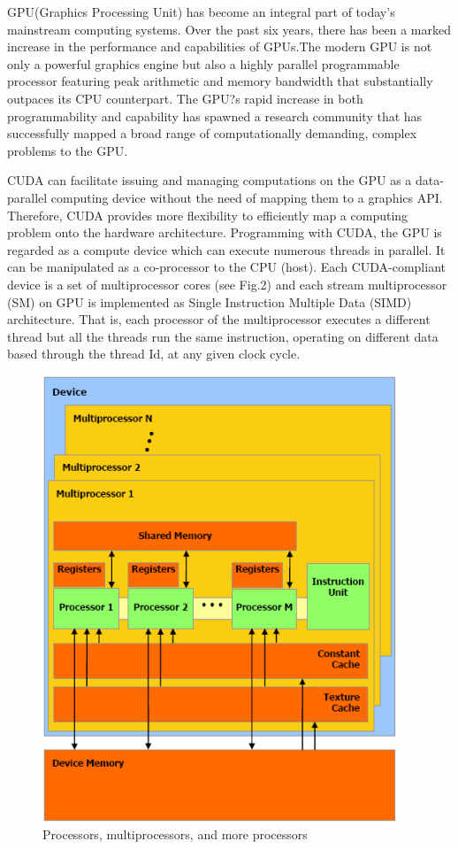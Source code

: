 \documentclass[letterpaper,twocolumn,10pt]{article}
\begin{document}
GPU(Graphics Processing Unit) has become an integral part of today's mainstream computing systems. Over the past six years, there has been a marked increase in the performance and capabilities of GPUs.The modern GPU is not only a powerful graphics engine but also a highly parallel programmable processor featuring peak arithmetic and memory bandwidth that substantially outpaces its CPU counterpart. The GPU?s rapid increase in both programmability and capability has spawned a research community that has successfully mapped a broad range of computationally demanding, complex problems to the GPU. 

CUDA can facilitate issuing and managing computations on the GPU as a data-parallel computing device without the need of mapping them to a graphics API. Therefore, CUDA provides more flexibility to efficiently map a computing problem onto the hardware architecture.
Programming with CUDA, the GPU is regarded as a compute device which can execute numerous threads in parallel. It can be manipulated as a co-processor to the CPU (host). Each CUDA-compliant device is a set of multiprocessor cores (see Fig.2) and each stream multiprocessor (SM) on GPU is implemented as Single Instruction Multiple Data (SIMD) architecture. That is, each processor of the multiprocessor executes a different thread but all the threads run the same instruction, operating on different data based through the thread Id, at any given clock cycle.

\begin{figure}[h!]
\centering
\includegraphics[scale=0.7]{cuda1.png}
\caption{Processors, multiprocessors, and more processors}
\label{threadsVsSync}
\end{figure}
\end{document}
